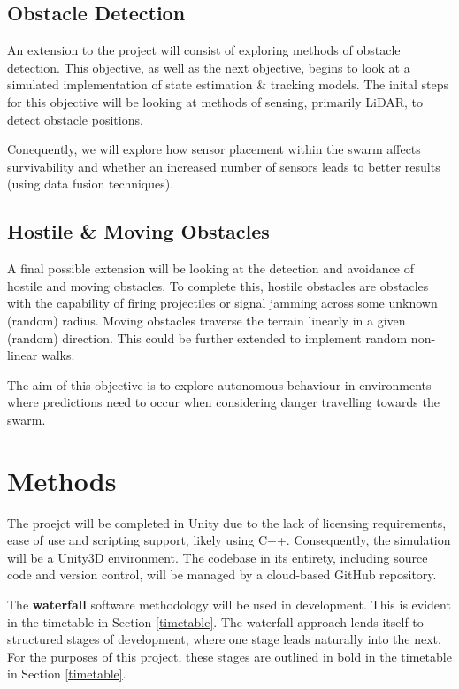 \documentclass{article}
\begin{document}
\subsection{Obstacle Detection}
An extension to the project will consist of exploring methods of obstacle detection. This objective, as well as the next objective, begins to look at a simulated implementation of state estimation \& tracking models. The inital steps for this objective will be looking at methods of sensing, primarily LiDAR\cite{8491889}, to detect obstacle positions.

Conequently, we will explore how sensor placement within the swarm affects survivability and whether an increased number of sensors leads to better results (using data fusion techniques).

\subsection{Hostile \& Moving Obstacles}
A final possible extension will be looking at the detection and avoidance of hostile and moving obstacles. To complete this,
hostile obstacles are obstacles with the capability of firing projectiles or signal jamming across some unknown (random) radius. Moving
obstacles traverse the terrain linearly in a given (random) direction. This could be further extended to implement random non-linear walks.

The aim of this objective is to explore autonomous behaviour in environments where predictions need to occur when considering danger travelling
towards the swarm.

\section{Methods}
The proejct will be completed in Unity due to the lack of licensing requirements, ease of use and scripting support\cite{unity}, likely using C++. Consequently, the simulation will be a Unity3D environment. The codebase in its entirety, including source code and version control, will be managed by a cloud-based GitHub repository\cite{git}.

The \textbf{waterfall} software methodology will be used in development. This is evident in the timetable in Section \ref{timetable}. The waterfall approach lends itself to structured stages of development, where one stage leads naturally into the next. For the purposes of this project, these stages are outlined in bold in the timetable in Section \ref{timetable}.
\end{document}

